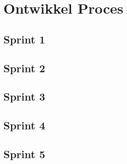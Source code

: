 \section{Ontwikkel Proces}

\subsection{Sprint 1}
\subsection{Sprint 2}
\subsection{Sprint 3}
\subsection{Sprint 4}
\subsection{Sprint 5}
